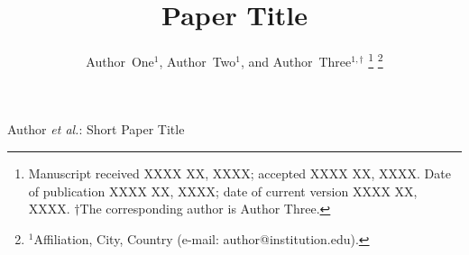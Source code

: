 \documentclass[journal,twoside]{IEEEtran}
\begin{document}
\graphicspath{{./figures/}{./photos/}{./}}

\title{Paper Title}

\author{
Author~One$^{1}$,
Author~Two$^{1}$, and
Author~Three$^{1,\dagger}$
\thanks{Manuscript received XXXX XX, XXXX; accepted XXXX XX, XXXX.
Date of publication XXXX XX, XXXX; date of current version XXXX XX, XXXX.
$\dagger$The corresponding author is Author Three.}
\thanks{$^{1}$Affiliation, City, Country (e-mail: author@institution.edu).}}

%
{Author \MakeLowercase{\textit{et al.}}: Short Paper Title}

\IEEEoverridecommandlockouts
{}

\maketitle









\end{document}
